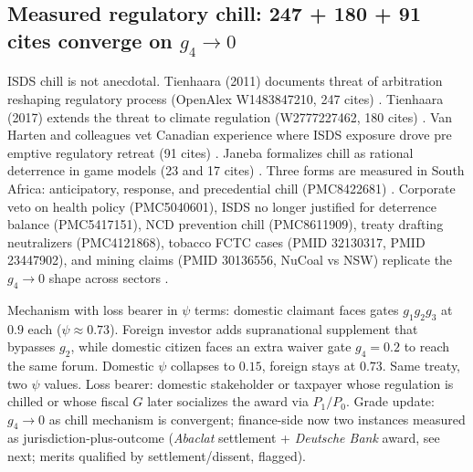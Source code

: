 \documentclass[11pt]{article}
\begin{document}
\subsection{Measured regulatory chill: 247 + 180 + 91 cites converge on $g_4 \to 0$}
ISDS chill is not anecdotal. Tienhaara (2011) documents threat of arbitration reshaping regulatory process (OpenAlex W1483847210, 247 cites) \citep{tienhaara2011}. Tienhaara (2017) extends the threat to climate regulation (W2777227462, 180 cites) \citep{tienhaara2017}. Van Harten and colleagues vet Canadian experience where ISDS exposure drove pre emptive regulatory retreat (91 cites) \citep{vanharten2015}. Janeba formalizes chill as rational deterrence in game models (23 and 17 cites) \citep{janeba2016,janeba2019}. Three forms are measured in South Africa: anticipatory, response, and precedential chill (PMC8422681) \citep{pmc8422681}. Corporate veto on health policy (PMC5040601), ISDS no longer justified for deterrence balance (PMC5417151), NCD prevention chill (PMC8611909), treaty drafting neutralizers (PMC4121868), tobacco FCTC cases (PMID 32130317, PMID 23447902), and mining claims (PMID 30136556, NuCoal vs NSW) replicate the $g_4 \to 0$ shape across sectors \citep{pmc5040601,pmc5417151,pmc8611909,pmc4121868,pmid32130317,pmid23447902,pmid30136556}.

Mechanism with loss bearer in $\psi$ terms: domestic claimant faces gates $g_1 g_2 g_3$ at $0.9$ each ($\psi \approx 0.73$). Foreign investor adds supranational supplement that bypasses $g_2$, while domestic citizen faces an extra waiver gate $g_4=0.2$ to reach the same forum. Domestic $\psi$ collapses to $0.15$, foreign stays at $0.73$. Same treaty, two $\psi$ values. Loss bearer: domestic stakeholder or taxpayer whose regulation is chilled or whose fiscal $G$ later socializes the award via $P_1/P_0$. Grade update: $g_4 \to 0$ as chill mechanism is convergent; finance-side now two instances measured as jurisdiction-plus-outcome (\textit{Abaclat} settlement + \textit{Deutsche Bank} award, see next; merits qualified by settlement/dissent, flagged).
\end{document}
